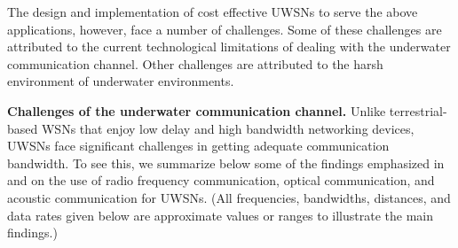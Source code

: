 The design and implementation of cost effective UWSNs to serve the above applications, however, face a number of challenges.
Some of these challenges are attributed to the current technological limitations of dealing with the underwater communication channel. Other challenges are attributed to the harsh environment of underwater environments.

\textbf{Challenges of the underwater communication channel.} Unlike terrestrial-based WSNs that enjoy low delay and high bandwidth networking devices, UWSNs face significant challenges in getting adequate communication bandwidth.  To see this, we summarize below some of the findings emphasized in \cite{partan2007survey} and  \cite{akyildiz2005underwater} on the use of radio frequency communication, optical communication, and acoustic communication for UWSNs. (All frequencies, bandwidths, distances, and data rates given below are approximate values or ranges to illustrate the main findings.)




